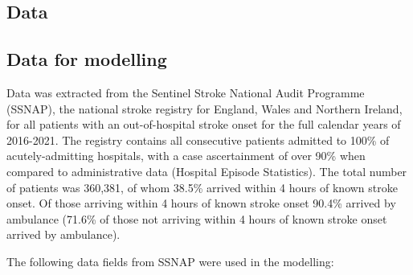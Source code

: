 \subsection{Data}

\subsection{Data for modelling}

Data was extracted from the Sentinel Stroke National Audit Programme (SSNAP), the national stroke registry for England, Wales and Northern Ireland, for all patients with an out-of-hospital stroke onset for the full calendar years of 2016-2021. The registry contains all consecutive patients admitted to 100\% of acutely-admitting hospitals, with a case ascertainment of over 90\% when compared to administrative data (Hospital Episode Statistics). The total number of patients was 360,381, of whom 38.5\% arrived within 4 hours of known stroke onset. Of those arriving within 4 hours of known stroke onset 90.4\% arrived by ambulance (71.6\% of those not arriving within 4 hours of known stroke onset arrived by ambulance).

The following data fields from SSNAP were used in the modelling:

